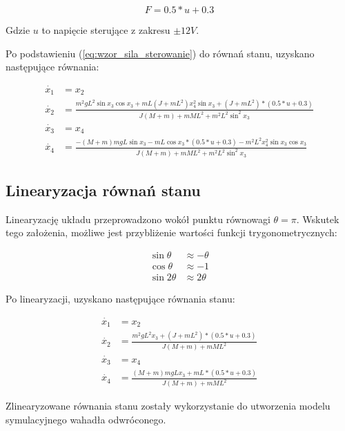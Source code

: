 \documentclass[12pt]{article}
\numberwithin{equation}{section}
\begin{document}
\begin{equation}
    F = 0.5*u + 0.3 \label{eq:wzor_sila_sterowanie}
\end{equation}

Gdzie $u$ to napięcie sterujące z zakresu $\pm 12V$.

Po podstawieniu (\ref{eq:wzor_sila_sterowanie}) do równań stanu, uzyskano następujące równania:

\begin{align}
    \dot{x_{1}} &= x_{2} \\
    \dot{x_{2}} &= \frac{m^{2}gL^{2}\sin{x_{3}}\cos{x_{3}} + mL(J + mL^{2})x_{4}^{2}\sin{x_{3}} + (J+ mL^{2}) * (0.5*u + 0.3)}{J(M + m) + mML^{2} + m^{2}L^{2}\sin^{2}{x_{3}}} \\
    \dot{x_{3}} &= x_{4} \\
    \dot{x_{4}} & = \frac{-(M + m)mgL\sin{x_{3}} - mL\cos{x_{3}}*(0.5*u + 0.3) - m^{2}L^{2}x_{4}^{2}\sin{x_{3}}\cos{x_{3}}}{J(M + m) + mML^{2} + m^{2}L^{2}\sin^{2}{x_{3}}}
\end{align}

\subsection{Linearyzacja równań stanu}

Linearyzację układu przeprowadzono wokół punktu równowagi $\theta = \pi$. Wskutek tego założenia, możliwe jest przybliżenie wartości funkcji trygonometrycznych:

\begin{align*}
    \sin{\theta} &\approx -\theta \\
    \cos{\theta} &\approx -1 \\
    \sin{2\theta} &\approx 2\theta
\end{align*}

Po linearyzacji, uzyskano następujące równania stanu:

\begin{align}
    \dot{x_{1}} &= x_{2} \\
    \dot{x_{2}} &= \frac{m^{2}gL^{2}x_{3} + (J+ mL^{2}) * (0.5*u + 0.3)}{J(M + m) + mML^{2}} \\
    \dot{x_{3}} &= x_{4} \\
    \dot{x_{4}} & = \frac{(M + m)mgLx_{3} + mL*(0.5*u + 0.3)}{J(M + m) + mML^{2}}
\end{align}

Zlinearyzowane równania stanu zostały wykorzystanie do utworzenia modelu symulacyjnego wahadła odwróconego.
\end{document}
